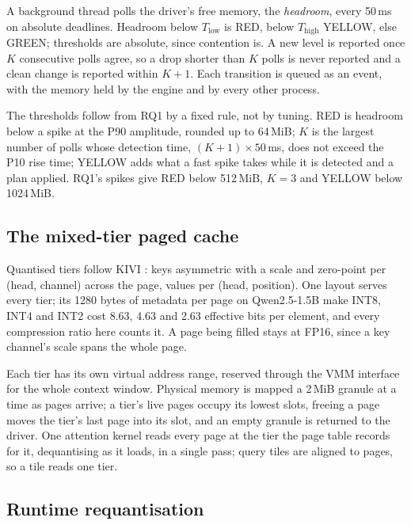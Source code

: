 \documentclass{article}
\begin{document}
A background thread polls the driver's free memory, the \textit{headroom},
every 50\,ms on absolute deadlines. Headroom below $T_\mathrm{low}$ is RED,
below $T_\mathrm{high}$ YELLOW, else GREEN; thresholds are absolute, since
contention is. A new level is reported once $K$ consecutive polls agree, so a
drop shorter than $K$ polls is never reported and a clean change is reported
within $K+1$. Each transition is queued as an event, with the memory held by
the engine and by every other process.

The thresholds follow from RQ1 by a fixed rule, not by tuning. RED is headroom
below a spike at the P90 amplitude, rounded up to 64\,MiB; $K$ is the largest
number of polls whose detection time, $(K+1) \times 50$\,ms, does not exceed the
P10 rise time; YELLOW adds what a fast spike takes while it is detected and a
plan applied. RQ1's spikes give RED below 512\,MiB, $K = 3$ and YELLOW below
1024\,MiB.

\subsection{The mixed-tier paged cache}
\label{sec:cache}

Quantised tiers follow KIVI \cite{liu2024kivi}: keys asymmetric with a scale
and zero-point per (head, channel) across the page, values per (head,
position). One layout serves every tier; its 1280 bytes of metadata per page
on Qwen2.5-1.5B make INT8, INT4 and INT2 cost 8.63, 4.63 and 2.63 effective
bits per element, and every compression ratio here counts it. A page being
filled stays at FP16, since a key channel's scale spans the whole page.

Each tier has its own virtual address range, reserved through the VMM interface
for the whole context window. Physical memory is mapped a 2\,MiB granule at a
time as pages arrive; a tier's live pages occupy its lowest slots, freeing a
page moves the tier's last page into its slot, and an empty granule is returned
to the driver. One attention kernel reads every page at the tier the page table
records for it, dequantising as it loads, in a single pass; query tiles are
aligned to pages, so a tile reads one tier.

\subsection{Runtime requantisation}
\label{sec:requantisation}
\end{document}
